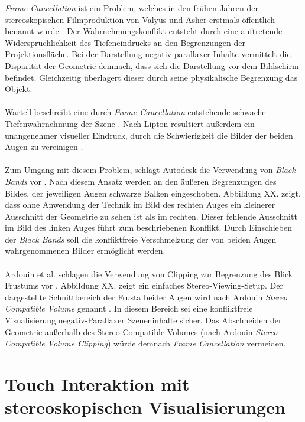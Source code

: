 \emph{Frame Cancellation} ist ein Problem, welches in den frühen Jahren der stereoskopischen Filmproduktion von Valyus und Asher erstmals öffentlich benannt wurde \cite{valyus:1966}. Der Wahrnehmungskonflikt entsteht durch eine auftretende Widersprüchlichkeit des Tiefeneindrucks an den Begrenzungen der Projektionsfläche. Bei der Darstellung negativ-parallaxer Inhalte vermittelt die Disparität der Geometrie demnach, dass sich die Darstellung vor dem Bildschirm befindet. Gleichzeitig überlagert dieser durch seine physikalische Begrenzung das Objekt. 
\\\\
Wartell beschreibt eine durch \emph{Frame Cancellation} entstehende schwache Tiefenwahrnehmung der Szene \cite{wartell:2001}. Nach Lipton resultiert außerdem ein unangenehmer visueller Eindruck, durch die Schwierigkeit die Bilder der beiden Augen zu vereinigen \cite{lipton:2007}. 
\\\\
Zum Umgang mit diesem Problem, schlägt Autodesk die Verwendung von \emph{Black Bands} vor \cite{autodesk:2008}. Nach diesem Ansatz werden an den äußeren Begrenzungen des Bildes, der jeweiligen Augen schwarze Balken eingeschoben. Abbildung XX. zeigt, dass ohne Anwendung der Technik im Bild des rechten Auges ein kleinerer Ausschnitt der Geometrie zu sehen ist als im rechten. Dieser fehlende Ausschnitt im Bild des linken Auges führt zum beschriebenen Konflikt. Durch Einschieben der \emph{Black Bands} soll die konfliktfreie Verschmelzung der von beiden Augen wahrgenommenen Bilder ermöglicht werden. 
\\\\
Ardouin et al. schlagen die Verwendung von Clipping zur Begrenzung des Blick Frustums vor \cite{ardouin:2011}. Abbildung XX. zeigt ein einfaches Stereo-Viewing-Setup. Der dargestellte Schnittbereich der Frusta beider Augen wird nach Ardouin \emph{Stereo Compatible Volume} genannt \cite{ardouin:2011}. In diesem Bereich sei eine konfliktfreie Visualisierung negativ-Parallaxer Szeneninhalte sicher. Das Abschneiden der Geometrie außerhalb des Stereo Compatible Volumes (nach Ardouin \emph{Stereo Compatible Volume Clipping}) würde demnach \emph{Frame Cancellation} vermeiden.


\section{Touch Interaktion mit stereoskopischen Visualisierungen}
\label{sec:related_touch_interaktion_stereo}

